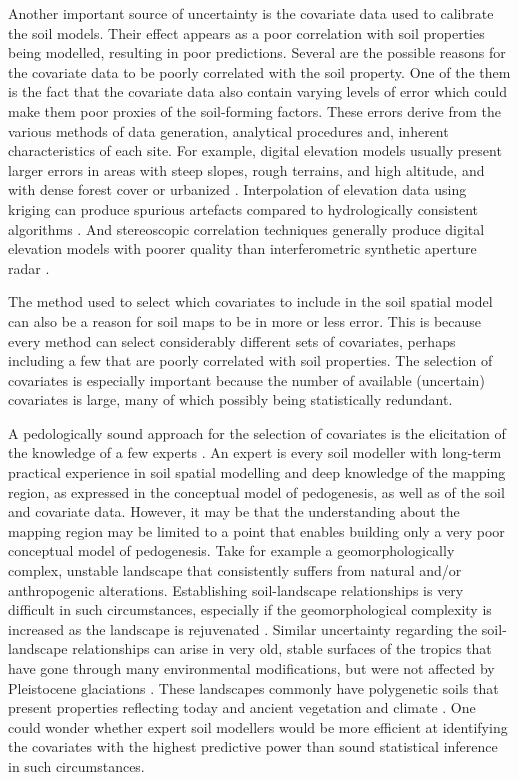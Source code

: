 Another important source of uncertainty is the covariate data used to calibrate the soil models. Their effect 
appears as a poor correlation with soil properties being modelled, resulting in poor predictions. Several are 
the possible reasons for the covariate data to be poorly correlated with the soil property. One of the them is 
the fact that the covariate data also contain varying levels of error \cite{HeuvelinkEtAl1989} which could 
make them poor proxies of the soil-forming factors. These errors derive from the various methods of data 
generation, analytical procedures and, inherent characteristics of each site. For example, digital elevation 
models usually present larger errors in areas with steep slopes, rough terrains, and high altitude, and with 
dense forest cover or urbanized \cite{Florinsky1998, Toutin2000, FisherEtAl2006}. Interpolation of elevation 
data using kriging can produce spurious artefacts \cite{HenglEtAl2009} compared to hydrologically consistent 
algorithms \cite{Hutchinson1989}. And stereoscopic correlation techniques generally produce digital elevation 
models with poorer quality than interferometric synthetic aperture radar \cite{HirtEtAl2010}.

The method used to select which covariates to include in the soil spatial model can also be a reason for soil 
maps to be in more or less error. This is because every method can select considerably different sets of 
covariates, perhaps including a few that are poorly correlated with soil properties. The selection of 
covariates is especially important because the number of available (uncertain) covariates is large, many of 
which possibly being statistically redundant. 

A pedologically sound approach for the selection of covariates is the elicitation of the knowledge of a 
few experts \cite{LarkEtAl2007a, MeyerEtAl2001}. An expert is every soil modeller with long-term practical 
experience in soil spatial modelling and deep knowledge of the mapping region, as expressed in the conceptual 
model of pedogenesis, as well as of the soil and covariate data. However, it may be that the understanding 
about the mapping region may be limited to a point that enables building only a very poor conceptual model of 
pedogenesis. Take for example a geomorphologically complex, unstable landscape that consistently suffers from 
natural and/or anthropogenic alterations. Establishing soil-landscape relationships is very difficult in such 
circumstances, especially if the geomorphological complexity is increased as the landscape is rejuvenated 
\cite{StreckEtAl2008}. Similar uncertainty regarding the soil-landscape relationships can arise in very old, 
stable surfaces of the tropics that have gone through many environmental modifications, but were not affected 
by Pleistocene glaciations \cite{MckenzieEtAl2006}. These landscapes commonly have polygenetic soils that 
present properties reflecting today and ancient vegetation and climate \cite{PainEtAl1995, Ker1998}. One could 
wonder whether expert soil modellers would be more efficient at identifying the covariates with the highest 
predictive power than sound statistical inference in such circumstances.

